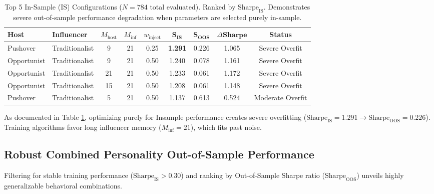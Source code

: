\documentclass[11pt,a4paper]{article}
\begin{document}
\begin{table}[htbp]
\centering
\small
\caption{Top 5 In-Sample (IS) Configurations ($N=784$ total evaluated). Ranked by $\text{Sharpe}_{\text{IS}}$. Demonstrates severe out-of-sample performance degradation when parameters are selected purely in-sample.}
\label{tab:top_IS}
\begin{tabular}{llccccc cc}
\toprule
\textbf{Host} & \textbf{Influencer} & $M_{\text{host}}$ & $M_{\text{inf}}$ & $w_{\text{inject}}$ & $\mathbf{S_{\text{IS}}}$ & $\mathbf{S_{\text{OOS}}}$ & $\Delta \mathbf{Sharpe}$ & \textbf{Status} \\
\midrule
Pushover & Traditionalist & 9 & 21 & 0.25 & \textbf{1.291} & 0.226 & 1.065 & Severe Overfit \\
Opportunist & Traditionalist & 9 & 21 & 0.50 & 1.240 & 0.078 & 1.161 & Severe Overfit \\
Opportunist & Traditionalist & 21 & 21 & 0.50 & 1.233 & 0.061 & 1.172 & Severe Overfit \\
Opportunist & Traditionalist & 15 & 21 & 0.50 & 1.208 & 0.061 & 1.148 & Severe Overfit \\
Pushover & Traditionalist & 5 & 21 & 0.50 & 1.137 & 0.613 & 0.524 & Moderate Overfit \\
\bottomrule
\end{tabular}
\end{table}

As documented in Table \ref{tab:top_IS}, optimizing purely for Insample performance creates severe overfitting ($\text{Sharpe}_{\text{IS}} = 1.291 \to \text{Sharpe}_{\text{OOS}} = 0.226$). Training algorithms favor long influencer memory ($M_{\text{inf}}=21$), which fits past noise.

\subsection{Robust Combined Personality Out-of-Sample Performance}
Filtering for stable training performance ($\text{Sharpe}_{\text{IS}} > 0.30$) and ranking by Out-of-Sample Sharpe ratio ($\text{Sharpe}_{\text{OOS}}$) unveils highly generalizable behavioral combinations.
\end{document}
